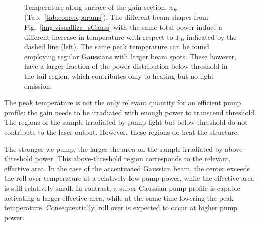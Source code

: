 \begin{figure}
\centering
{}
\caption{Temperature along surface of the gain section, $z_\mathrm{0g}$
(Tab.~\ref{tab:comsolparams}).
The different beam shapes from Fig.~\ref{img:visuallize_sGauss}
with the same total power
induce a different increase in temperature
with respect to $T_0$,
indicated by the dashed line (left).
The same peak temperature can be found
employing regular Gaussians
with larger beam spots.
These however,
have a larger fraction
of the power distribution
below threshold
in the tail region,
which contributes only to heating
but no light emission.}
\label{img:Comsol_Tvsr}
\end{figure}

The peak temperature
is not the only relevant quantity
for an efficient pump profile:
the gain needs to be irradiated
with enough power
to transcend threshold.
The regions of the sample
irradiated by pump light
but below threshold
do not contribute to the laser output.
However, these regions do heat the structure.

The stronger we pump,
the larger the area on the sample
irradiated by above-threshold power.
This above-threshold
region corresponds to
the relevant, effective area.
In the case of the accentuated Gaussian beam,
the center exceeds
the roll over temperature
at a relatively low pump power,
while the effective area
is still relatively small.
In contrast,
a super-Gaussian pump profile
is capable activating
a larger effective area,
while at the same time
lowering the peak temperature.
Consequentially,
roll over is expected
to occur at higher pump power.

